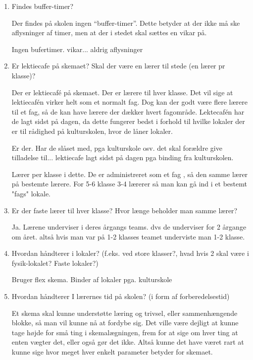 \begin{enumerate}
	\item Findes buffer-timer? 

	Der findes på skolen ingen ``buffer-timer''. Dette betyder at der ikke må ske aflysninger af timer, men at der i stedet skal sættes en vikar på.

	\noindent\makebox[\linewidth]{\rule{\paperwidth}{0.4pt}}
	Ingen bufertimer. vikar... aldrig aflysninger
	\noindent\makebox[\linewidth]{\rule{\paperwidth}{0.4pt}}
	

	\item Er lektiecafe på skemaet? Skal der være en lærer til stede (en lærer pr klasse)?

	Der er lektiecaf\'e på skemaet. Der er lærere til hver klasse. Det vil sige at lektiecaf\'en virker helt som et normalt fag. Dog kan der godt være flere lærere til et fag, så de kan have lærere der dækker hvert fagområde. Lektecaf\'en har de lagt sidst på dagen, da dette fungerer bedst i forhold til hvilke lokaler der er til rådighed på kulturskolen, hvor de låner lokaler.

	\noindent\makebox[\linewidth]{\rule{\paperwidth}{0.4pt}}
	Er der. Har de slåset med, pga kulturskole osv. det skal forældre give tilladelse til... lektiecafe lagt sidst på dagen pga binding fra kulturskolen.  

	Lærer per klasse i dette. De er administreret som et fag , så den samme lærer på bestemte lærere. For 5-6 klasse 3-4 lærerer så man kan gå ind i et bestemt "fags" lokale. 
	\noindent\makebox[\linewidth]{\rule{\paperwidth}{0.4pt}}
	
	\item Er der faste lærer til hver klasse? Hvor længe beholder man samme lærer?

	Ja. Lærene underviser i deres årgangs teams. dvs de underviser for 2 årgange om året. altså hvis man var på 1-2 klasses teamet underviste man 1-2 klasse.
	
	\item Hvordan håndterer i lokaler? (f.eks. ved store klasser?, hvad hvis 2 skal være i fysik-lokalet? Faste lokaler?)
	
	Bruger flex skema. Binder af lokaler pga. kulturskole
	
	\item Hvordan håndterer I lærernes tid på skolen? (i form af forberedelsestid)
	
	Et skema skal kunne understøtte læring og trivsel, eller sammenhængende blokke, så man vil kunne nå at fordybe sig. Det ville være dejligt at kunne tage højde for små ting i skemalægningen, frem for at sige om hver ting at enten vægter det, eller også gør det ikke. Altså kunne det have været rart at kunne sige hvor meget hver enkelt parameter betyder for skemaet. 
	

\end{enumerate}
